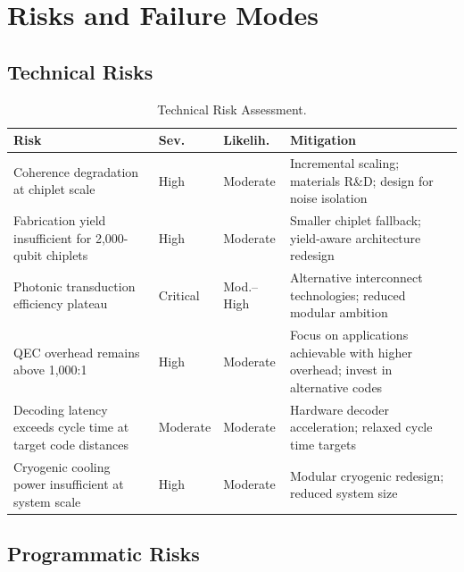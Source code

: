 \documentclass[conference]{IEEEtran}
\begin{document}
\section{Risks and Failure Modes}

\subsection{Technical Risks}

\begin{table}[htbp]
\centering
\caption{Technical Risk Assessment.}
\label{tab:tech_risks}
\begin{tabular}{p{2.5cm}p{1cm}p{1.2cm}p{2.8cm}}
\toprule
\textbf{Risk} & \textbf{Sev.} & \textbf{Likelih.} & \textbf{Mitigation} \\
\midrule
Coherence degradation at chiplet scale & High & Moderate & Incremental scaling; materials R\&D; design for noise isolation \\
Fabrication yield insufficient for 2,000-qubit chiplets & High & Moderate & Smaller chiplet fallback; yield-aware architecture redesign \\
Photonic transduction efficiency plateau & Critical & Mod.--High & Alternative interconnect technologies; reduced modular ambition \\
QEC overhead remains above 1,000:1 & High & Moderate & Focus on applications achievable with higher overhead; invest in alternative codes \\
Decoding latency exceeds cycle time at target code distances & Moderate & Moderate & Hardware decoder acceleration; relaxed cycle time targets \\
Cryogenic cooling power insufficient at system scale & High & Moderate & Modular cryogenic redesign; reduced system size \\
\bottomrule
\end{tabular}
\end{table}

\subsection{Programmatic Risks}
\end{document}
